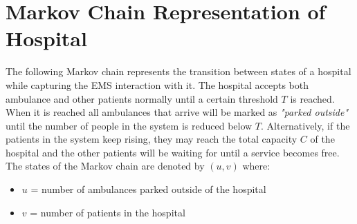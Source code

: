 \documentclass{article}
\begin{document}
\section{Markov Chain Representation of Hospital}
The following Markov chain represents the transition between states of a hospital while capturing the EMS interaction with it. The hospital accepts both ambulance and other patients normally until a certain threshold $T$ is reached. When it is reached all ambulances that arrive will be marked as \textit{"parked outside"} until the number of people in the system is reduced below $T$. Alternatively, if the patients in the system keep rising, they may reach the total capacity $C$ of the hospital and the other patients will be waiting for until a service becomes free. The states of the Markov chain are denoted by $(u,v)$ where:
\begin{itemize}
    \item $u$ = number of ambulances parked outside of the hospital
    \item $v$ = number of patients in the hospital
\end{itemize}
\end{document}
